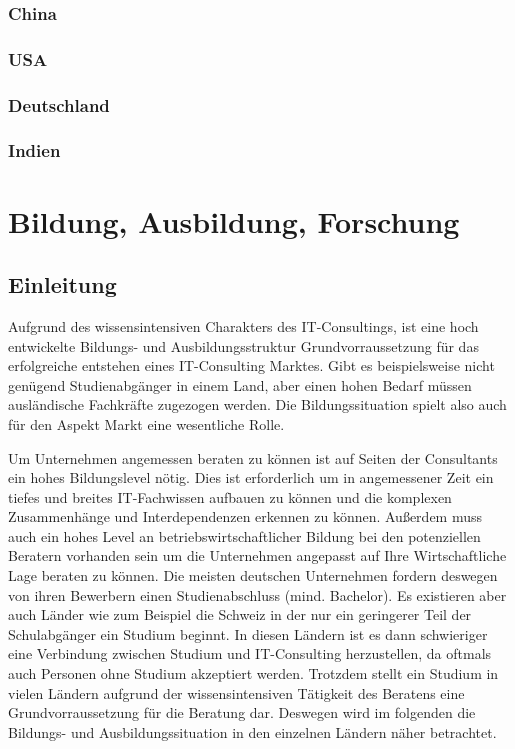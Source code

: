 	\subsection{China}
	
	
	\subsection{USA}
	
	
	\subsection{Deutschland}
	
	
	\subsection{Indien}


\chapter{Bildung, Ausbildung, Forschung}

\section{Einleitung}
Aufgrund des wissensintensiven Charakters des IT-Consultings, ist eine hoch entwickelte Bildungs- und Ausbildungsstruktur Grundvorraussetzung für das erfolgreiche entstehen eines IT-Consulting Marktes. 
Gibt es beispielsweise nicht genügend Studienabgänger in einem Land, aber einen hohen Bedarf müssen ausländische Fachkräfte zugezogen werden. Die Bildungssituation spielt also auch für den Aspekt Markt eine wesentliche Rolle.

Um Unternehmen angemessen beraten zu können ist auf Seiten der Consultants ein hohes Bildungslevel nötig. Dies ist erforderlich um in angemessener Zeit ein tiefes und breites IT-Fachwissen aufbauen zu können und die komplexen Zusammenhänge und Interdependenzen erkennen zu können. Außerdem muss auch ein hohes Level an betriebswirtschaftlicher Bildung bei den potenziellen Beratern vorhanden sein um die Unternehmen angepasst auf Ihre Wirtschaftliche Lage beraten zu können.
Die meisten deutschen Unternehmen fordern deswegen von ihren Bewerbern einen Studienabschluss (mind. Bachelor). Es existieren aber auch Länder wie zum Beispiel die Schweiz in der nur ein geringerer Teil der Schulabgänger ein Studium beginnt. In diesen Ländern ist es dann schwieriger eine Verbindung zwischen Studium und IT-Consulting herzustellen, da oftmals auch Personen ohne Studium akzeptiert werden.
Trotzdem stellt ein Studium in vielen Ländern aufgrund der wissensintensiven Tätigkeit des Beratens eine Grundvorraussetzung für die Beratung dar.
Deswegen wird im folgenden die Bildungs- und Ausbildungssituation in den einzelnen Ländern näher betrachtet.

